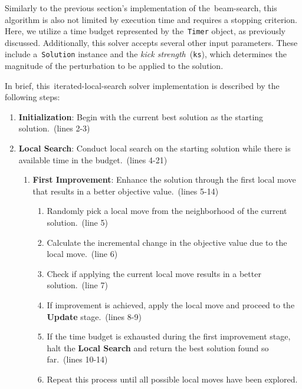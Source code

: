 Similarly to the previous section's implementation of the~\acrshort{beam-search},
this algorithm is also not limited by execution time and requires a stopping
criterion. Here, we utilize a time budget represented by the~\texttt{Timer}
object, as previously discussed. Additionally, this solver accepts several other
input parameters. These include a~\texttt{Solution} instance and the
\textit{kick strength}~(\texttt{ks}), which determines the magnitude of the
perturbation to be applied to the solution.



In brief, this~\acrshort{iterated-local-search} solver implementation is
described by the following steps:

\begin{enumerate}
      \item \textbf{Initialization}: Begin with the current best solution as the starting solution.~(lines 2-3)
      \item \textbf{Local Search}: Conduct local search on the starting solution
            while there is available time in the budget.~(lines 4-21)
            \begin{enumerate}
                  \item \textbf{First Improvement}: Enhance the solution through the first local move that results in
                        a better objective value.~(lines 5-14)
                        \begin{enumerate}
                              \item Randomly pick a local move from the neighborhood of the current solution.~(line 5)
                              \item Calculate the incremental change in the objective value due to the local move.~(line 6)
                              \item Check if applying the current local move results in a better solution.~(line 7)
                              \item If improvement is achieved, apply the local move and proceed to the \textbf{Update} stage.~(lines 8-9)
                              \item If the time budget is exhausted during the first improvement stage, halt the \textbf{Local Search}
                                    and return the best solution found so far.~(lines 10-14)
                              \item Repeat this process until all possible local moves have been explored.

\end{enumerate}
\end{enumerate}
\end{enumerate}
